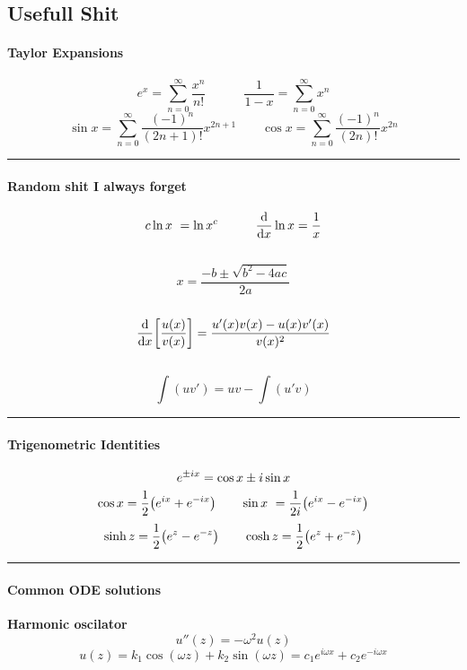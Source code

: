 \documentclass[10pt,a4paper]{article}
\renewcommand{\exp}{e^}
\newcommand{\holine}{\rule{286pt}{1pt}}
\newcommand{\half}{\frac{1}{2}}
\begin{document}
\begin{multicols}{2}


\part*{Usefull Shit}

\subsection*{Taylor Expansions}
\[
    \exp{x} = \sum_{n=0}^\infty \dfrac{x^n}{n!} \quad\quad\quad
    \frac{1}{1-x} = \sum_{n=0}^\infty x^n
\]
\[
    \sin{x} = \sum_{n=0}^\infty \dfrac{(-1)^n}{(2n+1)!}x^{2n+1} \quad\quad
    \cos{x} = \sum_{n=0}^\infty \dfrac{(-1)^n}{(2n)!}x^{2n}
\]


\holine
\subsection*{Random shit I always forget}
\[
    c \ln{x} = \ln{x^c} \quad\quad\quad \dv{x}\ln{x} = \frac{1}{x}
\]
\\
\[
    x = \frac{-b\pm \sqrt{b^2 - 4ac}}{2a}
\]
\\
\[
    \dv{x}\qty[\dfrac{u(x)}{v(x)}] = \dfrac{u'(x)v(x) - u(x)v'(x)}{v(x)^2}
\]
\\
\[
    \int (uv') = uv - \int(u'v)
\]


\holine
\subsection*{Trigenometric Identities}
\[
    \exp{\pm i x} = \cos{x} \pm i\sin{x} \\
\]
\[
    \cos{x} = \half \qty(\exp{ix} + \exp{-ix}) \quad\quad
    \sin{x} = \frac{1}{2i}\qty(\exp{ix} - \exp{-ix})
\]
\[
    \sinh{z} = \half\qty(\exp{z}-\exp{-z}) \quad\quad \cosh{z} = \half\qty(\exp{z}+\exp{-z})
\]

\holine
\subsection*{Common ODE solutions}
\textbf{Harmonic oscilator}
\[
    u''(z) = -\omega^2 u(z)
\]
\[
    u(z) = k_1 \cos(\omega z) + k_2\sin(\omega z) = c_1 \exp{i\omega x} + c_2 \exp{-i\omega x}
\]




\vspace*{\fill}
\columnbreak

\end{multicols}
\end{document}

